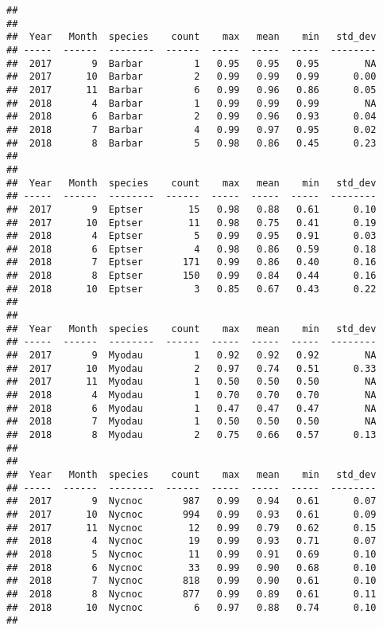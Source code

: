 \documentclass[]{article}
\begin{document}
\begin{verbatim}
## 
## 
##  Year   Month  species    count    max   mean    min   std_dev
## -----  ------  --------  ------  -----  -----  -----  --------
##  2017       9  Barbar         1   0.95   0.95   0.95        NA
##  2017      10  Barbar         2   0.99   0.99   0.99      0.00
##  2017      11  Barbar         6   0.99   0.96   0.86      0.05
##  2018       4  Barbar         1   0.99   0.99   0.99        NA
##  2018       6  Barbar         2   0.99   0.96   0.93      0.04
##  2018       7  Barbar         4   0.99   0.97   0.95      0.02
##  2018       8  Barbar         5   0.98   0.86   0.45      0.23
## 
## 
##  Year   Month  species    count    max   mean    min   std_dev
## -----  ------  --------  ------  -----  -----  -----  --------
##  2017       9  Eptser        15   0.98   0.88   0.61      0.10
##  2017      10  Eptser        11   0.98   0.75   0.41      0.19
##  2018       4  Eptser         5   0.99   0.95   0.91      0.03
##  2018       6  Eptser         4   0.98   0.86   0.59      0.18
##  2018       7  Eptser       171   0.99   0.86   0.40      0.16
##  2018       8  Eptser       150   0.99   0.84   0.44      0.16
##  2018      10  Eptser         3   0.85   0.67   0.43      0.22
## 
## 
##  Year   Month  species    count    max   mean    min   std_dev
## -----  ------  --------  ------  -----  -----  -----  --------
##  2017       9  Myodau         1   0.92   0.92   0.92        NA
##  2017      10  Myodau         2   0.97   0.74   0.51      0.33
##  2017      11  Myodau         1   0.50   0.50   0.50        NA
##  2018       4  Myodau         1   0.70   0.70   0.70        NA
##  2018       6  Myodau         1   0.47   0.47   0.47        NA
##  2018       7  Myodau         1   0.50   0.50   0.50        NA
##  2018       8  Myodau         2   0.75   0.66   0.57      0.13
## 
## 
##  Year   Month  species    count    max   mean    min   std_dev
## -----  ------  --------  ------  -----  -----  -----  --------
##  2017       9  Nycnoc       987   0.99   0.94   0.61      0.07
##  2017      10  Nycnoc       994   0.99   0.93   0.61      0.09
##  2017      11  Nycnoc        12   0.99   0.79   0.62      0.15
##  2018       4  Nycnoc        19   0.99   0.93   0.71      0.07
##  2018       5  Nycnoc        11   0.99   0.91   0.69      0.10
##  2018       6  Nycnoc        33   0.99   0.90   0.68      0.10
##  2018       7  Nycnoc       818   0.99   0.90   0.61      0.10
##  2018       8  Nycnoc       877   0.99   0.89   0.61      0.11
##  2018      10  Nycnoc         6   0.97   0.88   0.74      0.10
## 

\end{verbatim}
\end{document}
